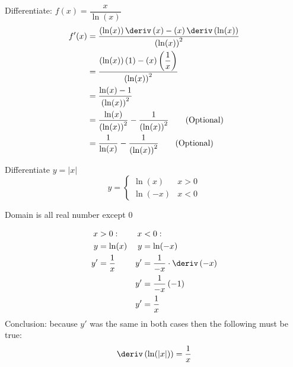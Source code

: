 \begin{example}
    Differentiate: $f(x) = \dfrac{x}{\ln(x)}$
    \begin{align*}
        f'(x) &= \dfrac{\left(\ln(x)\right)\deriv\left(x\right) - \left(x\right)\deriv\left(\ln(x)\right)}{\left(\ln(x)\right)^2} \\
              &= \dfrac{\left(\ln(x)\right)\left(1\right) - \left(x\right)\left(\dfrac{1}{x}\right)}{\left(\ln(x)\right)^2} \\
              &= \dfrac{\ln(x) - 1}{\left(\ln(x)\right)^2} \\
              &= \dfrac{\ln(x)}{\left(\ln(x)\right)^2} - \dfrac{1}{\left(\ln(x)\right)^2} \tag{Optional} \\
              &= \dfrac{1}{\ln(x)} - \dfrac{1}{\left(\ln(x)\right)^2} \tag{Optional}
    \end{align*}
\end{example}
\begin{example}
    Differentiate $y = \left|x\right|$
    \begin{equation*}
        y = \begin{cases}
            \ln(x) & x > 0 \\
            \ln(-x) & x < 0
        \end{cases}
    \end{equation*}
    \begin{note}
        Domain is all real number except 0
    \end{note}
    \begin{align*}
        x  &> 0:           & x  &< 0: \\
        y  &= \ln(x)       & y  &= \ln(-x) \\
        y' &= \dfrac{1}{x} & y' &= \dfrac{1}{-x} \cdot \deriv \left(-x\right) \\
           &               & y' &= \dfrac{1}{-x} \left(-1\right) \\
           &               & y' &= \dfrac{1}{x}
    \end{align*}
    Conclusion: because $y'$ was the same in both cases then the following must be true:
    \begin{equation*}
        \deriv\left(\ln(\left|x\right|)\right) = \dfrac{1}{x}
    \end{equation*}
\end{example}
